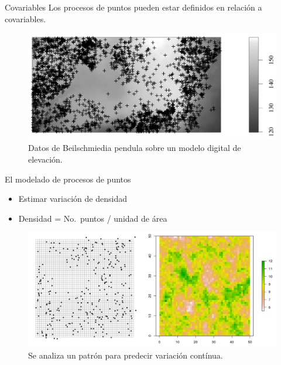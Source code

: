 \documentclass[
  11pt,
  ignorenonframetext,
]{beamer}
\begin{document}
\begin{frame}{Covariables}
\protect\hypertarget{covariables}{}
Los procesos de puntos pueden estar definidos en relación a covariables.

\begin{figure}
\centering
\includegraphics{Figuras/Covariables.png}
\caption{Datos de Beilschmiedia pendula sobre un modelo digital de
elevación.}
\end{figure}
\end{frame}

\begin{frame}{El modelado de procesos de puntos}
\protect\hypertarget{el-modelado-de-procesos-de-puntos}{}
\begin{itemize}
\item
  Estimar variación de densidad
\item
  Densidad = No.~puntos / unidad de área
\end{itemize}

\begin{figure}
\centering
\includegraphics{Figuras/Conteos-estimacion.png}
\caption{Se analiza un patrón para predecir variación contínua.}
\end{figure}
\end{frame}
\end{document}
